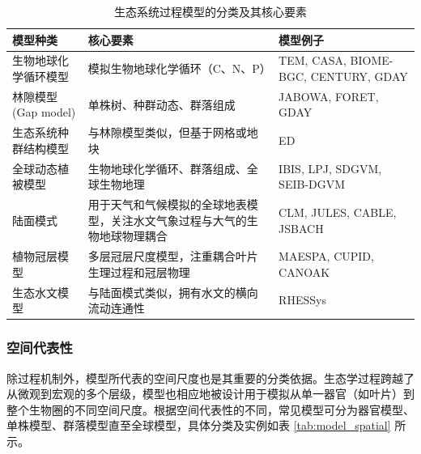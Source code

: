 \documentclass[10pt]{config}
\begin{document}
\vspace{0.5em}

\begin{table}[h]
    \centering
    \caption{生态系统过程模型的分类及其核心要素}
    \small %
    \renewcommand{\arraystretch}{1.3} %
    \begin{tabular}{p{3.5cm} p{7cm} m{4.5cm}}
        \toprule
        \textbf{模型种类} & \textbf{核心要素} & \textbf{模型例子} \\
        \midrule
        生物地球化学循环模型 & 模拟生物地球化学循环（C、N、P） & TEM, CASA, BIOME-BGC, CENTURY, GDAY \\
        林隙模型 (Gap model) & 单株树、种群动态、群落组成 & JABOWA, FORET, GDAY \\
        生态系统种群结构模型 & 与林隙模型类似，但基于网格或地块 & ED \\
        全球动态植被模型 & 生物地球化学循环、群落组成、全球生物地理 & IBIS, LPJ, SDGVM, SEIB-DGVM \\
        陆面模式 & 用于天气和气候模拟的全球地表模型，关注水文气象过程与大气的生物地球物理耦合 & CLM, JULES, CABLE, JSBACH \\
        植物冠层模型 & 多层冠层尺度模型，注重耦合叶片生理过程和冠层物理 & MAESPA, CUPID, CANOAK \\
        生态水文模型 & 与陆面模式类似，拥有水文的横向流动连通性 & RHESSys \\
        \bottomrule
    \end{tabular}
    \label{tab:model_process}
\end{table}

\subsubsection{空间代表性}

除过程机制外，模型所代表的空间尺度也是其重要的分类依据。生态学过程跨越了从微观到宏观的多个层级，模型也相应地被设计用于模拟从单一器官（如叶片）到整个生物圈的不同空间尺度。根据空间代表性的不同，常见模型可分为器官模型、单株模型、群落模型直至全球模型，具体分类及实例如表 \ref{tab:model_spatial} 所示。

\vspace{0.5em}
\end{document}
